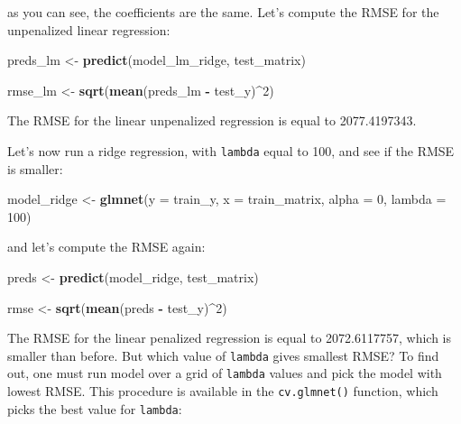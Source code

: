 \documentclass[]{gitbook}
\newenvironment{Shaded}{\begin{snugshade}}{\end{snugshade}}
\newcommand{\DataTypeTok}[1]{\textcolor[rgb]{0.13,0.29,0.53}{#1}}
\newcommand{\DecValTok}[1]{\textcolor[rgb]{0.00,0.00,0.81}{#1}}
\newcommand{\KeywordTok}[1]{\textcolor[rgb]{0.13,0.29,0.53}{\textbf{#1}}}
\newcommand{\NormalTok}[1]{#1}
\newcommand{\OperatorTok}[1]{\textcolor[rgb]{0.81,0.36,0.00}{\textbf{#1}}}
\newcommand{\StringTok}[1]{\textcolor[rgb]{0.31,0.60,0.02}{#1}}
\begin{document}
as you can see, the coefficients are the same. Let's compute the RMSE for the unpenalized linear
regression:

\begin{Shaded}
\begin{Highlighting}[]
\NormalTok{preds_lm <-}\StringTok{ }\KeywordTok{predict}\NormalTok{(model_lm_ridge, test_matrix)}

\NormalTok{rmse_lm <-}\StringTok{ }\KeywordTok{sqrt}\NormalTok{(}\KeywordTok{mean}\NormalTok{(preds_lm }\OperatorTok{-}\StringTok{ }\NormalTok{test_y)}\OperatorTok{^}\DecValTok{2}\NormalTok{)}
\end{Highlighting}
\end{Shaded}

The RMSE for the linear unpenalized regression is equal to 2077.4197343.

Let's now run a ridge regression, with \texttt{lambda} equal to 100, and see if the RMSE is smaller:

\begin{Shaded}
\begin{Highlighting}[]
\NormalTok{model_ridge <-}\StringTok{ }\KeywordTok{glmnet}\NormalTok{(}\DataTypeTok{y =}\NormalTok{ train_y, }\DataTypeTok{x =}\NormalTok{ train_matrix, }\DataTypeTok{alpha =} \DecValTok{0}\NormalTok{, }\DataTypeTok{lambda =} \DecValTok{100}\NormalTok{)}
\end{Highlighting}
\end{Shaded}

and let's compute the RMSE again:

\begin{Shaded}
\begin{Highlighting}[]
\NormalTok{preds <-}\StringTok{ }\KeywordTok{predict}\NormalTok{(model_ridge, test_matrix)}

\NormalTok{rmse <-}\StringTok{ }\KeywordTok{sqrt}\NormalTok{(}\KeywordTok{mean}\NormalTok{(preds }\OperatorTok{-}\StringTok{ }\NormalTok{test_y)}\OperatorTok{^}\DecValTok{2}\NormalTok{)}
\end{Highlighting}
\end{Shaded}

The RMSE for the linear penalized regression is equal to 2072.6117757, which is smaller than before.
But which value of \texttt{lambda} gives smallest RMSE? To find out, one must run model over a grid of
\texttt{lambda} values and pick the model with lowest RMSE. This procedure is available in the \texttt{cv.glmnet()}
function, which picks the best value for \texttt{lambda}:
\end{document}
